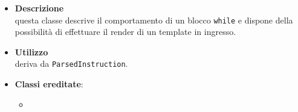\label{\nogloxy{swedesigner::server::project::ParsedWhile}}
\begin{itemize}
\item \textbf{Descrizione}\\
questa classe descrive il comportamento di un blocco \texttt{while} e dispone della possibilità di effettuare il render di un template in ingresso.
\item \textbf{Utilizzo}\\
deriva da \texttt{ParsedInstruction}.
\item \textbf{Classi ereditate}:
\begin{itemize}
\item \hyperref[\nogloxy{swedesigner::server::project::ParsedInstruction}]{}
\end{itemize}
\end{itemize}
\subsection{}
\label{\nogloxy{swedesigner::server::stereotype}}
